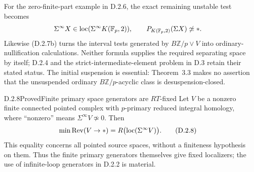 \begin{remark}
For the zero-finite-part example in D.2.6, the exact remaining unstable
test becomes
\[
 \Sigma^\infty X\in\operatorname{loc}(\Sigma^\infty K(\mathbb F_p,2)),
 \qquad P_{K(\mathbb F_p,2)}(\Sigma X)\not\simeq *.
\]
Likewise \textup{(D.2.7b)} turns the interval tests generated by
$B\mathbb Z/p\vee V$ into ordinary-nullification calculations.
Neither formula supplies the required separating space by itself;
D.2.4 and the strict-intermediate-element problem in D.3 retain
their stated status. The initial suspension is essential:
Theorem~3.3 makes no assertion that the unsuspended ordinary
$B\mathbb Z/p$-acyclic class is desuspension-closed.
\end{remark}

\begin{claim}{D.2.8}{Proved}{Finite primary space generators are $RT$-fixed}
Let $V$ be a nonzero finite connected pointed complex with $p$-primary
reduced integral homology, where ``nonzero'' means
$\Sigma^\infty V\not\simeq0$. Then
\[
 \min\mathrm{Rev}(V\to *)
   =R\bigl(\operatorname{loc}(\Sigma^\infty V)\bigr).
 \tag{D.2.8}
\]
This equality concerns all pointed source spaces, without a finiteness
hypothesis on them. Thus the finite primary generators themselves
give fixed localizers; the use of infinite-loop generators in D.2.2
is material.
\end{claim}

